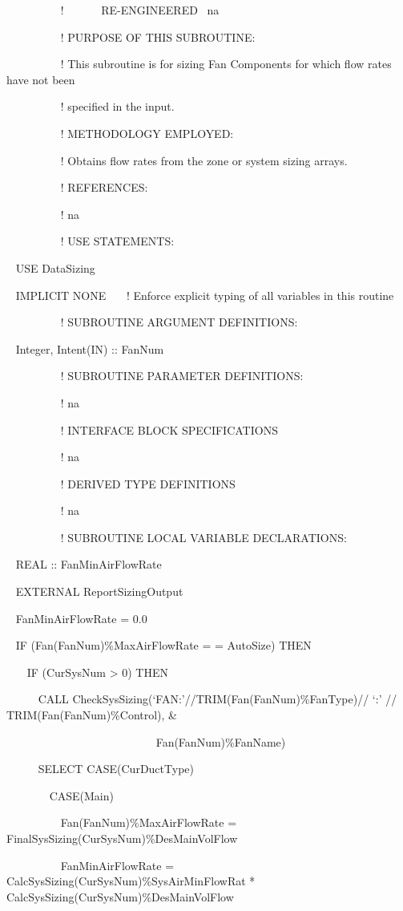 ~~~~~~~~~ !~~~~~~ RE-ENGINEERED~ na

~~~~~~~~~ ! PURPOSE OF THIS SUBROUTINE:

~~~~~~~~~ ! This subroutine is for sizing Fan Components for which flow rates have not been

~~~~~~~~~ ! specified in the input.

~~~~~~~~~ ! METHODOLOGY EMPLOYED:

~~~~~~~~~ ! Obtains flow rates from the zone or system sizing arrays.

~~~~~~~~~ ! REFERENCES:

~~~~~~~~~ ! na

~~~~~~~~~ ! USE STATEMENTS:

~ USE DataSizing

~ IMPLICIT NONE~~~ ! Enforce explicit typing of all variables in this routine

~~~~~~~~~ ! SUBROUTINE ARGUMENT DEFINITIONS:

~ Integer, Intent(IN) :: FanNum

~~~~~~~~~ ! SUBROUTINE PARAMETER DEFINITIONS:

~~~~~~~~~ ! na

~~~~~~~~~ ! INTERFACE BLOCK SPECIFICATIONS

~~~~~~~~~ ! na

~~~~~~~~~ ! DERIVED TYPE DEFINITIONS

~~~~~~~~~ ! na

~~~~~~~~~ ! SUBROUTINE LOCAL VARIABLE DECLARATIONS:

~ REAL :: FanMinAirFlowRate

~ EXTERNAL ReportSizingOutput

~ FanMinAirFlowRate = 0.0

~ IF (Fan(FanNum)\%MaxAirFlowRate = = AutoSize) THEN

~~~ IF (CurSysNum \textgreater{} 0) THEN

~~~~~ CALL CheckSysSizing(`FAN:'//TRIM(Fan(FanNum)\%FanType)// `:' // TRIM(Fan(FanNum)\%Control), \&

~~~~~~~~~~~~~~~~~~~~~~~~~~ Fan(FanNum)\%FanName)

~~~~~ SELECT CASE(CurDuctType)

~~~~~~~ CASE(Main)

~~~~~~~~~ Fan(FanNum)\%MaxAirFlowRate = FinalSysSizing(CurSysNum)\%DesMainVolFlow

~~~~~~~~~ FanMinAirFlowRate = CalcSysSizing(CurSysNum)\%SysAirMinFlowRat * CalcSysSizing(CurSysNum)\%DesMainVolFlow

